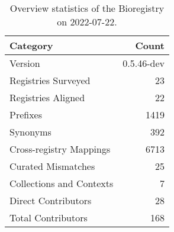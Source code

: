 \begin{table}
\centering
\caption{Overview statistics of the Bioregistry on 2022-07-22.}
\label{tab:bioregistry-summary}
\begin{tabular}{lr}
\toprule
                Category &      Count \\
\midrule
                 Version & 0.5.46-dev \\
     Registries Surveyed &         23 \\
      Registries Aligned &         22 \\
                Prefixes &       1419 \\
                Synonyms &        392 \\
 Cross-registry Mappings &       6713 \\
      Curated Mismatches &         25 \\
Collections and Contexts &          7 \\
     Direct Contributors &         28 \\
      Total Contributors &        168 \\
\bottomrule
\end{tabular}
\end{table}
